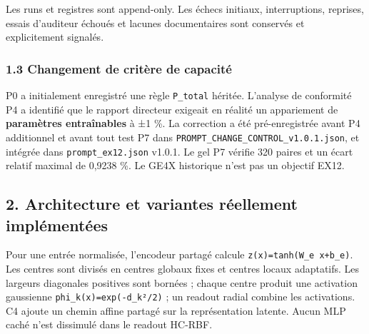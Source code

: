 \documentclass[
]{article}
\begin{document}
Les runs et registres sont append-only. Les échecs initiaux,
interruptions, reprises, essais d'auditeur échoués et lacunes
documentaires sont conservés et explicitement signalés.

\subsubsection{1.3 Changement de critère de
capacité}\label{changement-de-crituxe8re-de-capacituxe9}

P0 a initialement enregistré une règle \texttt{P\_total} héritée.
L'analyse de conformité P4 a identifié que le rapport directeur exigeait
en réalité un appariement de \textbf{paramètres entraînables} à ±1 \%.
La correction a été pré-enregistrée avant P4 additionnel et avant tout
test P7 dans \texttt{PROMPT\_CHANGE\_CONTROL\_v1.0.1.json}, et intégrée
dans \texttt{prompt\_ex12.json} v1.0.1. Le gel P7 vérifie 320 paires et
un écart relatif maximal de 0,9238 \%. Le GE4X historique n'est pas un
objectif EX12.

\subsection{2. Architecture et variantes réellement
implémentées}\label{architecture-et-variantes-ruxe9ellement-impluxe9mentuxe9es}

Pour une entrée normalisée, l'encodeur partagé calcule
\texttt{z(x)=tanh(W\_e\ x+b\_e)}. Les centres sont divisés en centres
globaux fixes et centres locaux adaptatifs. Les largeurs diagonales
positives sont bornées ; chaque centre produit une activation gaussienne
\texttt{phi\_k(x)=exp(-d\_k²/2)} ; un readout radial combine les
activations. C4 ajoute un chemin affine partagé sur la représentation
latente. Aucun MLP caché n'est dissimulé dans le readout HC-RBF.
\end{document}
